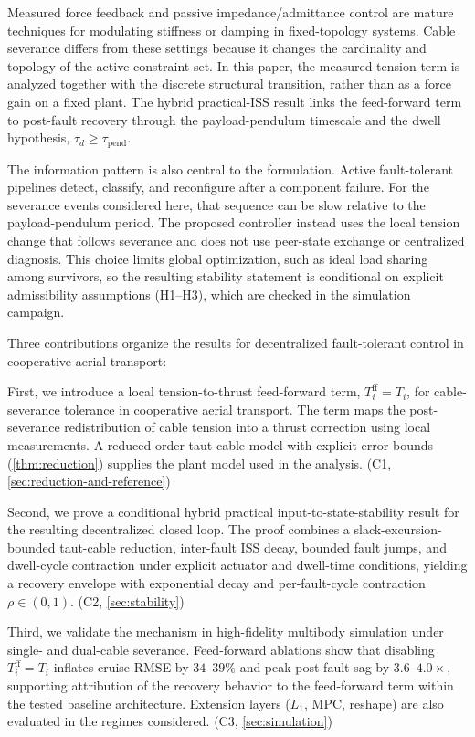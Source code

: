 \documentclass[lettersize,journal]{IEEEtran}
\begin{document}
Measured force feedback and passive impedance/admittance control are mature techniques for modulating stiffness or damping in fixed-topology systems. Cable severance differs from these settings because it changes the cardinality and topology of the active constraint set. In this paper, the measured tension term is analyzed together with the discrete structural transition, rather than as a force gain on a fixed plant. The hybrid practical-ISS result links the feed-forward term to post-fault recovery through the payload-pendulum timescale and the dwell hypothesis, $\tau_d \ge \tau_{\mathrm{pend}}$.

The information pattern is also central to the formulation. Active fault-tolerant pipelines detect, classify, and reconfigure after a component failure. For the severance events considered here, that sequence can be slow relative to the payload-pendulum period. The proposed controller instead uses the local tension change that follows severance and does not use peer-state exchange or centralized diagnosis. This choice limits global optimization, such as ideal load sharing among survivors, so the resulting stability statement is conditional on explicit admissibility assumptions (H1--H3), which are checked in the simulation campaign.

Three contributions organize the results for decentralized fault-tolerant control in cooperative aerial transport:

First, we introduce a local tension-to-thrust feed-forward term, $T_i^{\mathrm{ff}} = T_i$, for cable-severance tolerance in cooperative aerial transport. The term maps the post-severance redistribution of cable tension into a thrust correction using local measurements. A reduced-order taut-cable model with explicit error bounds (\cref{thm:reduction}) supplies the plant model used in the analysis. (C1, \cref{sec:reduction-and-reference})

Second, we prove a conditional hybrid practical input-to-state-stability result for the resulting decentralized closed loop. The proof combines a slack-excursion-bounded taut-cable reduction, inter-fault ISS decay, bounded fault jumps, and dwell-cycle contraction under explicit actuator and dwell-time conditions, yielding a recovery envelope with exponential decay and per-fault-cycle contraction $\rho \in (0,1)$. (C2, \cref{sec:stability})

Third, we validate the mechanism in high-fidelity multibody simulation under single- and dual-cable severance. Feed-forward ablations show that disabling $T_i^{\mathrm{ff}} = T_i$ inflates cruise RMSE by $34$--$39\%$ and peak post-fault sag by $3.6$--$4.0\times$, supporting attribution of the recovery behavior to the feed-forward term within the tested baseline architecture. Extension layers ($L_1$, MPC, reshape) are also evaluated in the regimes considered. (C3, \cref{sec:simulation})
\end{document}
